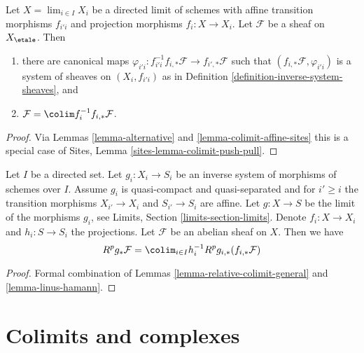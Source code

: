 \begin{lemma}
\label{lemma-linus-hamann}
Let $X = \lim_{i \in I} X_i$ be a directed limit of schemes
with affine transition morphisms $f_{i'i}$ and projection morphisms
$f_i : X \to X_i$. Let $\mathcal{F}$ be a sheaf on $X_\etale$. Then
\begin{enumerate}
\item there are canonical maps
$\varphi_{i'i} : f_{i'i}^{-1}f_{i, *}\mathcal{F} \to f_{i', *}\mathcal{F}$
such that $(f_{i, *}\mathcal{F}, \varphi_{i'i})$ is a system of
sheaves on $(X_i, f_{i'i})$ as in
Definition \ref{definition-inverse-system-sheaves}, and
\item $\mathcal{F} = \colim f_i^{-1}f_{i, *}\mathcal{F}$.
\end{enumerate}
\end{lemma}

\begin{proof}
Via Lemmas \ref{lemma-alternative} and \ref{lemma-colimit-affine-sites}
this is a special case of
Sites, Lemma \ref{sites-lemma-colimit-push-pull}.
\end{proof}

\begin{lemma}
\label{lemma-compute-strangely}
Let $I$ be a directed set. Let $g_i : X_i \to S_i$ be an inverse system of
morphisms of schemes over $I$. Assume $g_i$ is quasi-compact and
quasi-separated and for $i' \geq i$ the transition morphisms
$X_{i'} \to X_i$ and $S_{i'} \to S_i$ are affine.
Let $g : X \to S$ be the limit of the morphisms $g_i$, see
Limits, Section \ref{limits-section-limits}.
Denote $f_i : X \to X_i$ and $h_i : S \to S_i$ the projections.
Let $\mathcal{F}$ be an  abelian sheaf on $X$. Then we have
$$
R^pg_*\mathcal{F} = \colim_{i \in I} h_i^{-1}R^pg_{i, *}(f_{i, *}\mathcal{F})
$$
\end{lemma}

\begin{proof}
Formal combination of Lemmas \ref{lemma-relative-colimit-general}
and \ref{lemma-linus-hamann}.
\end{proof}











\section{Colimits and complexes}
\label{section-colimit-complexes}


